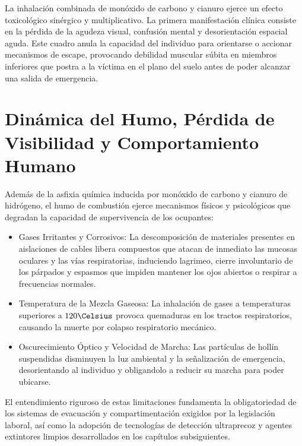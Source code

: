 La inhalación combinada de monóxido de carbono y cianuro ejerce un efecto toxicológico sinérgico y multiplicativo. La
primera manifestación clínica consiste en la pérdida de la agudeza visual, confusión mental y desorientación espacial
aguda. Este cuadro anula la capacidad del individuo para orientarse o accionar mecanismos de escape, provocando debilidad
muscular súbita en miembros inferiores que postra a la víctima en el plano del suelo antes de poder alcanzar una salida de
emergencia.

\section{Dinámica del Humo, Pérdida de Visibilidad y Comportamiento Humano}

Además de la asfixia química inducida por monóxido de carbono y cianuro de hidrógeno, el humo de combustión ejerce
mecanismos físicos y psicológicos que degradan la capacidad de supervivencia de los ocupantes:

\begin{itemize}
    \item Gases Irritantes y Corrosivos: La descomposición de materiales presentes en aislaciones de cables libera
          compuestos que atacan de inmediato las mucosas oculares y las vías respiratorias, induciendo lagrimeo, cierre
          involuntario de los párpados y espasmos que impiden mantener los ojos abiertos o respirar a frecuencias
          normales.
    \item Temperatura de la Mezcla Gaseosa: La inhalación de gases a temperaturas superiores a $120\Celsius$ provoca
          quemaduras en los tractos respiratorios, causando la muerte por colapso respiratorio mecánico.
    \item Oscurecimiento Óptico y Velocidad de Marcha: Las partículas de hollín suspendidas disminuyen la luz
          ambiental y la señalización de emergencia, desorientando al individuo y obligandolo a reducir su marcha para
          poder ubicarse.
\end{itemize}

El entendimiento riguroso de estas limitaciones fundamenta la obligatoriedad de los sistemas de evacuación y
compartimentación exigidos por la legislación laboral, así como la adopción de tecnologías de detección ultraprecoz y
agentes extintores limpios desarrollados en los capítulos subsiguientes.

